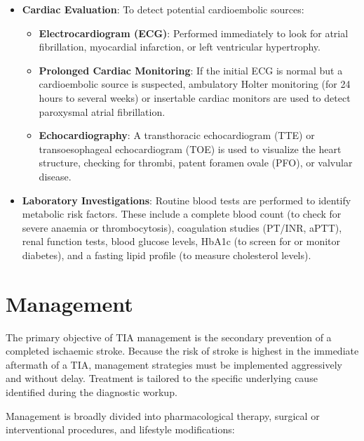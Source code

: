 \begin{itemize}
    \item \textbf{Cardiac Evaluation}: To detect potential cardioembolic sources:
    \begin{itemize}
        \item \textbf{Electrocardiogram (ECG)}: Performed immediately to look for atrial fibrillation, myocardial infarction, or left ventricular hypertrophy.
        \item \textbf{Prolonged Cardiac Monitoring}: If the initial ECG is normal but a cardioembolic source is suspected, ambulatory Holter monitoring (for 24 hours to several weeks) or insertable cardiac monitors are used to detect paroxysmal atrial fibrillation.
        \item \textbf{Echocardiography}: A transthoracic echocardiogram (TTE) or transoesophageal echocardiogram (TOE) is used to visualize the heart structure, checking for thrombi, patent foramen ovale (PFO), or valvular disease.
    \end{itemize}

    \item \textbf{Laboratory Investigations}: Routine blood tests are performed to identify metabolic risk factors. These include a complete blood count (to check for severe anaemia or thrombocytosis), coagulation studies (PT/INR, aPTT), renal function tests, blood glucose levels, HbA1c (to screen for or monitor diabetes), and a fasting lipid profile (to measure cholesterol levels).
\end{itemize}

\section*{Management}
The primary objective of TIA management is the secondary prevention of a completed ischaemic stroke. Because the risk of stroke is highest in the immediate aftermath of a TIA, management strategies must be implemented aggressively and without delay. Treatment is tailored to the specific underlying cause identified during the diagnostic workup.

Management is broadly divided into pharmacological therapy, surgical or interventional procedures, and lifestyle modifications:

